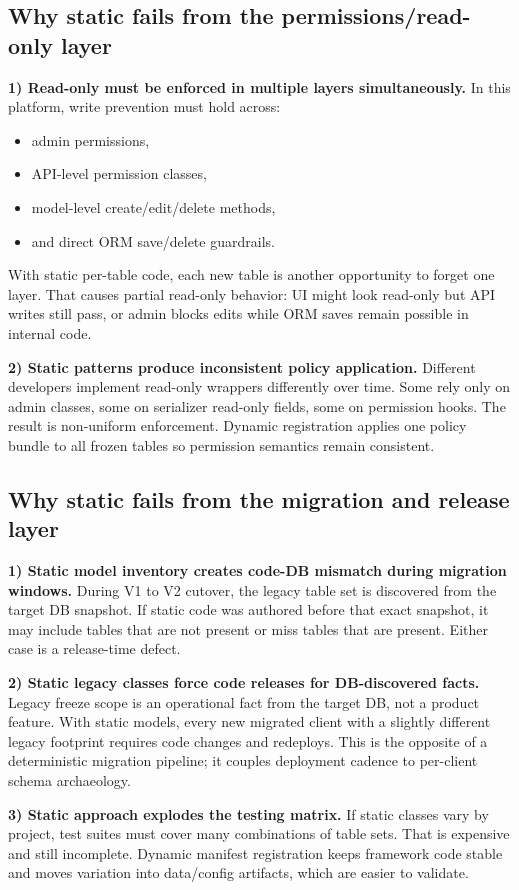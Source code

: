 \documentclass[11pt,a4paper]{article}
\begin{document}
\subsection*{Why static fails from the permissions/read-only layer}
\textbf{1) Read-only must be enforced in multiple layers simultaneously.}
In this platform, write prevention must hold across:
\begin{itemize}[leftmargin=1.5em]
  \item admin permissions,
  \item API-level permission classes,
  \item model-level create/edit/delete methods,
  \item and direct ORM save/delete guardrails.
\end{itemize}
With static per-table code, each new table is another opportunity to forget one layer.
That causes partial read-only behavior: UI might look read-only but API writes still pass,
or admin blocks edits while ORM saves remain possible in internal code.

\textbf{2) Static patterns produce inconsistent policy application.}
Different developers implement read-only wrappers differently over time. Some rely only on
admin classes, some on serializer read-only fields, some on permission hooks. The result is
non-uniform enforcement. Dynamic registration applies one policy bundle to all frozen tables
so permission semantics remain consistent.

\subsection*{Why static fails from the migration and release layer}
\textbf{1) Static model inventory creates code-DB mismatch during migration windows.}
During V1 to V2 cutover, the legacy table set is discovered from the target DB snapshot.
If static code was authored before that exact snapshot, it may include tables that are not
present or miss tables that are present. Either case is a release-time defect.

\textbf{2) Static legacy classes force code releases for DB-discovered facts.}
Legacy freeze scope is an operational fact from the target DB, not a product feature.
With static models, every new migrated client with a slightly different legacy footprint
requires code changes and redeploys. This is the opposite of a deterministic migration
pipeline; it couples deployment cadence to per-client schema archaeology.

\textbf{3) Static approach explodes the testing matrix.}
If static classes vary by project, test suites must cover many combinations of table sets.
That is expensive and still incomplete. Dynamic manifest registration keeps framework code
stable and moves variation into data/config artifacts, which are easier to validate.
\end{document}
